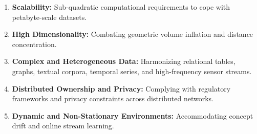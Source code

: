 \begin{enumerate}
    \item \textbf{Scalability:} Sub-quadratic computational requirements to cope with petabyte-scale datasets.
    \item \textbf{High Dimensionality:} Combating geometric volume inflation and distance concentration.
    \item \textbf{Complex and Heterogeneous Data:} Harmonizing relational tables, graphs, textual corpora, temporal series, and high-frequency sensor streams.
    \item \textbf{Distributed Ownership and Privacy:} Complying with regulatory frameworks and privacy constraints across distributed networks.
    \item \textbf{Dynamic and Non-Stationary Environments:} Accommodating concept drift and online stream learning.
\end{enumerate}
